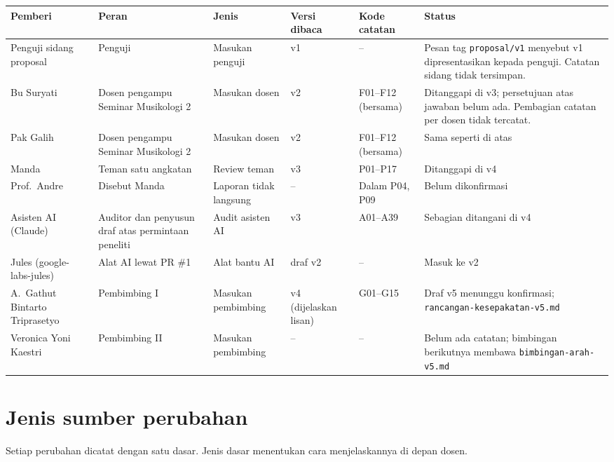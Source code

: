 \documentclass[a4paper,10pt]{article}
\begin{document}
\begin{tabularx}{\linewidth}{L{4.2cm} L{4.2cm} L{3.2cm} L{2.4cm} L{2.6cm} Y}
\toprule
\textbf{Pemberi} & \textbf{Peran} & \textbf{Jenis} & \textbf{Versi dibaca} & \textbf{Kode catatan} & \textbf{Status} \\
\midrule
Penguji sidang proposal & Penguji & Masukan penguji & v1 & -- & Pesan tag \texttt{proposal/v1} menyebut v1 dipresentasikan kepada penguji. Catatan sidang tidak tersimpan. \\
Bu Suryati & Dosen pengampu Seminar Musikologi 2 & \textcolor{dosen}{Masukan dosen} & v2 & F01--F12 (bersama) & Ditanggapi di v3; persetujuan atas jawaban belum ada. Pembagian catatan per dosen tidak tercatat. \\
Pak Galih & Dosen pengampu Seminar Musikologi 2 & \textcolor{dosen}{Masukan dosen} & v2 & F01--F12 (bersama) & Sama seperti di atas \\
Manda & Teman satu angkatan & \textcolor{teman}{Review teman} & v3 & P01--P17 & Ditanggapi di v4 \\
Prof.\ Andre & Disebut Manda & Laporan tidak langsung & -- & Dalam P04, P09 & Belum dikonfirmasi \\
Asisten AI (Claude) & Auditor dan penyusun draf atas permintaan peneliti & \textcolor{audit}{Audit asisten AI} & v3 & A01--A39 & Sebagian ditangani di v4 \\
Jules (google-labs-jules) & Alat AI lewat PR \#1 & \textcolor{alat}{Alat bantu AI} & draf v2 & -- & Masuk ke v2 \\
A.\ Gathut Bintarto Triprasetyo & Pembimbing I & \textcolor{pembimbing}{Masukan pembimbing} & v4 (dijelaskan lisan) & G01--G15 & Draf v5 menunggu konfirmasi; \texttt{rancangan-kesepakatan-v5.md} \\
Veronica Yoni Kaestri & Pembimbing II & \textcolor{pembimbing}{Masukan pembimbing} & -- & -- & Belum ada catatan; bimbingan berikutnya membawa \texttt{bimbingan-arah-v5.md} \\
\bottomrule
\end{tabularx}

\section{Jenis sumber perubahan}

Setiap perubahan dicatat dengan satu dasar. Jenis dasar menentukan cara menjelaskannya di depan dosen.
\end{document}
